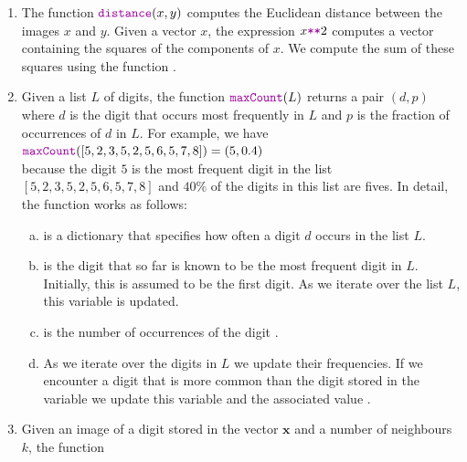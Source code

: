 \begin{enumerate}
      decompresses it.  In the file  the data is stored as a triple of pairs.
      For our purposes, we only need the first and the last component of this triple.  Each of these components
      is a pair of the form $(\textsl{data}, \textsl{label})$, where \textsl{data} is an array of images and
      \textsl{label} is an array specifying the digits represented in these images.
      The function  extracts the data stored in these pairs.
\item The function $\mytt{distance}(x, y)$ computes the Euclidean distance between the images $x$ and $y$.
      Given a vector $x$, the expression $x \mytt{**} 2$ computes a vector containing the squares of the
      components of $x$.  We compute the sum of these squares using the  function .
\item Given a list $L$ of digits, the function $\mytt{maxCount}(L)$ returns a pair $(d, p)$ where $d$ is the digit that occurs most frequently in $L$
      and $p$ is the fraction of occurrences of $d$ in $L$.  For example, we have
      \\[0.2cm]
      \hspace*{1.3cm}
      $\mytt{maxCount}([5,2,3,5,2,5,6,5,7,8]) = (5, 0.4)$
      \\[0.2cm]
      because the digit $5$ is the most frequent digit in the list $[5,2,3,5,2,5,6,5,7,8]$ and $40$\%
      of the digits in this list are fives.  In detail, the function  works as follows:
      \begin{enumerate}[(a)]
      \item {} is a dictionary that specifies how often a digit $d$ occurs in the list $L$.
      \item {} is the digit that so far is known to be the most frequent digit in $L$.
            Initially, this is assumed to be the first digit.  As we iterate over the list $L$, this variable
            is updated.
      \item {} is the number of occurrences of the digit .
      \item As we iterate over the digits in $L$ we update their frequencies.  If we encounter a digit that is
            more common than the digit stored in the variable  we update this variable
            and the associated value .
      \end{enumerate}
\item Given an image of a digit stored in the vector $\mathbf{x}$ and a number of neighbours $k$, the function

\end{enumerate}
